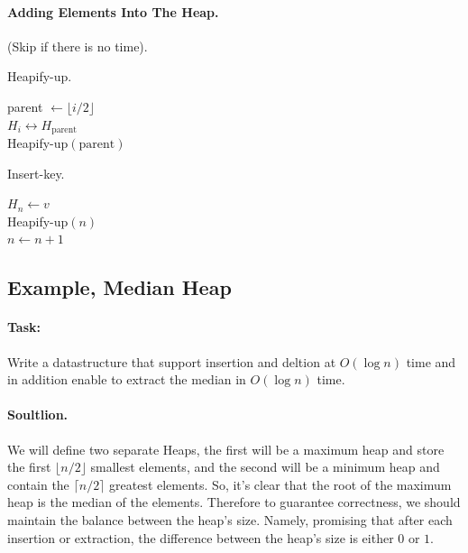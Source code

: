 \paragraph{Adding Elements Into The Heap.} (Skip if there is no time).

\begin{algbox}{Heapify-up.}
\begin{algorithm}[H]
parent $\leftarrow \lfloor i/2 \rfloor $ \\
 { 
  $ H_{i} \leftrightarrow H_{\text{parent}} $ \\ 
  Heapify-up$\left( \text{parent}  \right)$
}
\end{algorithm}
\end{algbox}



\begin{algbox}{Insert-key.}
\begin{algorithm}[H]
$ H_{n} \leftarrow v $ \\ 
Heapify-up$\left( n \right)$\\
$ n \leftarrow n + 1 $ 
\end{algorithm}
\end{algbox}



\newpage 
\subsection*{Example, Median Heap}

\paragraph{Task:}Write a datastructure that support insertion and deltion at $O\left( \log n \right) $ time and in addition enable to extract the median in $O\left( \log n  \right)$ time. 

\paragraph{Soultlion.} We will define two separate Heaps, the first will be a maximum heap and store the first $ \lfloor n/2 \rfloor $ smallest elements, and the second will be a minimum heap and contain the $ \lceil n/2 \rceil$ greatest elements. So, it's clear that the root of the maximum heap is the median of the elements. Therefore to guarantee correctness, we should maintain the balance between the heap's size. Namely, promising that after each insertion or extraction, the difference between the heap's size is either $0$ or $1$.

